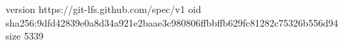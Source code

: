 version https://git-lfs.github.com/spec/v1
oid sha256:9dfd42839e0a8d34a921e2baae3c980806ffbbffb629fc81282c75326b556d94
size 5339
